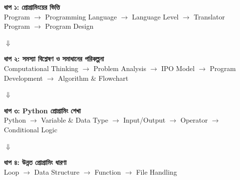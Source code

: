 \begin{pathbox}
\textbf{ধাপ ১: প্রোগ্রামিংয়ের ভিত্তি}\\
Program $\rightarrow$ Programming Language $\rightarrow$ Language Level $\rightarrow$ Translator Program $\rightarrow$ Program Design

\vspace{0.5mm}
$\Downarrow$

\textbf{ধাপ ২: সমস্যা বিশ্লেষণ ও সমাধানের পরিকল্পনা}\\
Computational Thinking $\rightarrow$ Problem Analysis $\rightarrow$ IPO Model $\rightarrow$ Program Development $\rightarrow$ Algorithm \& Flowchart

\vspace{0.5mm}
$\Downarrow$

\textbf{ধাপ ৩: Python প্রোগ্রামিং শেখা}\\
Python $\rightarrow$ Variable \& Data Type $\rightarrow$ Input/Output $\rightarrow$ Operator $\rightarrow$ Conditional Logic

\vspace{0.5mm}
$\Downarrow$

\textbf{ধাপ ৪: উন্নত প্রোগ্রামিং ধারণা}\\
Loop $\rightarrow$ Data Structure $\rightarrow$ Function $\rightarrow$ File Handling
\end{pathbox}

\small

